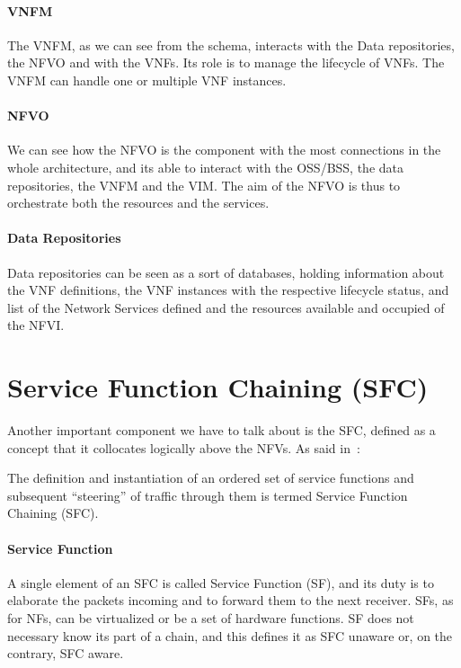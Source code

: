 \paragraph{VNFM}
The VNFM, as we can see from the schema, interacts with the Data repositories,
the NFVO and with the VNFs. Its role is to manage the lifecycle of VNFs. The
VNFM can handle one or multiple VNF instances.

\paragraph{NFVO}
We can see how the NFVO is the component with the most connections in the whole
architecture, and its able to interact with the OSS/BSS, the data repositories,
the VNFM and the VIM. The aim of the NFVO is thus to orchestrate both the
resources and the services.

\paragraph{Data Repositories}
Data repositories can be seen as a sort of databases, holding information about
the VNF definitions, the VNF instances with the respective lifecycle status, and
list of the Network Services defined and the resources available and occupied of
the NFVI.

\section{Service Function Chaining (SFC)}
Another important component we have to talk about is the SFC, defined as a
concept that it collocates logically above the NFVs. As said in~\cite{rfc7665}:
\begin{displayquote}
The definition and instantiation of an ordered set of service functions and
subsequent ``steering'' of traffic through them is termed Service Function
Chaining (SFC).
\end{displayquote}

\paragraph*{Service Function}
A single element of an SFC is called Service Function (SF), and its duty is to
elaborate the packets incoming and to forward them to the next receiver. SFs, as
for NFs, can be virtualized or be a set of hardware functions. SF does not
necessary know its part of a chain, and this defines it as SFC unaware or, on
the contrary, SFC aware.

